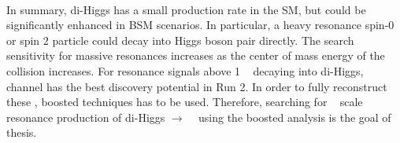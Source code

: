 \paragraph{}
In summary, di-Higgs has a small production rate in the SM, but could be significantly enhanced in BSM scenarios. In particular, a heavy resonance spin-0 or spin 2 particle could decay into Higgs boson pair directly. The search sensitivity for massive resonances increases as the center of mass energy of the collision increases. For resonance signals above 1 \TeV~ decaying into di-Higgs, \bbbb~ channel has the best discovery potential in Run 2. In order to fully reconstruct these \Xtohhb, boosted techniques has to be used. Therefore, searching for \TeV~ scale resonance production of di-Higgs $\to$ \bbbb~ using the boosted analysis is the goal of thesis.


